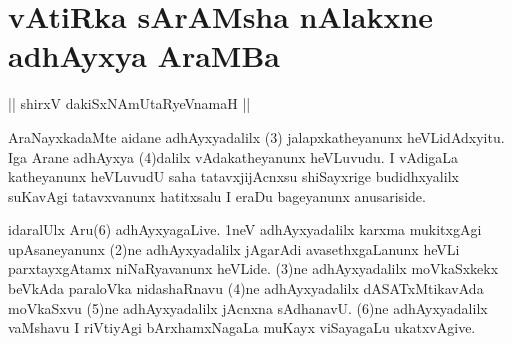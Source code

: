 \section*{vAtiRka sArAMsha nAlakxne adhAyxya AraMBa}

\begin{center}%
|| shirxV dakiSxNAmUtaRyeVnamaH ||
\end{center}


\begin{artha}
AraNayxkadaMte aidane adhAyxyadalilx (3) jalapxkatheyanunx heVLidAdxyitu. Iga Arane adhAyxya (4)dalilx vAdakatheyanunx heVLuvudu. I vAdigaLa katheyanunx heVLuvudU saha tatavxjijAcnxsu shiSayxrige budidhxyalilx suKavAgi tatavxvanunx hatitxsalu I eraDu bageyanunx anusariside.
\end{artha}


\begin{artha}
idaralUlx Aru(6) adhAyxyagaLive. 1neV adhAyxyadalilx karxma mukitxgAgi upAsaneyanunx (2)ne adhAyxyadalilx jAgarAdi avasethxgaLanunx heVLi parxtayxgAtamx niNaRyavanunx heVLide. (3)ne adhAyxyadalilx moVkaSxkekx beVkAda paraloVka nidashaRnavu (4)ne adhAyxyadalilx dASATxMtikavAda moVkaSxvu (5)ne adhAyxyadalilx jAcnxna sAdhanavU. (6)ne adhAyxyadalilx vaMshavu I riVtiyAgi bArxhamxNagaLa muKayx viSayagaLu ukatxvAgive.
\end{artha}


